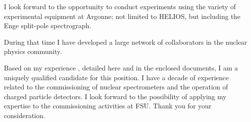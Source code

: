 {{\color{red}I look forward to the opportunity to conduct experiments 
using the variety of experimental equipment at Argonne; not limited to HELIOS, but including the Enge split-pole spectrograph.

 During that time I have developed a large network of collaborators in the nuclear physics community. %
}



%
%


\vspace{1.0\baselineskip}%
Based on my experience%
, detailed here and in the enclosed documents, I am a uniquely qualified candidate for this position.  I have a decade of experience related to the commissioning of nuclear spectrometers and the operation of charged particle detectors. I look forward to the possibility of applying my expertise to the commissioning activities %
at FSU. Thank you for your consideration. 
}

